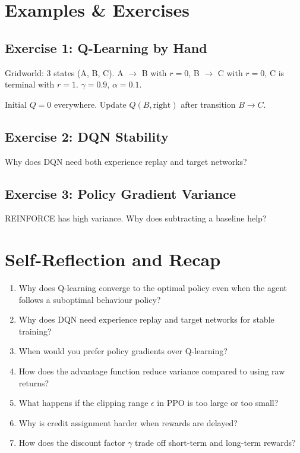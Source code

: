 
\newpage
\section{Examples \& Exercises}

\subsection{Exercise 1: Q-Learning by Hand}

Gridworld: 3 states (A, B, C). A $\to$ B with $r{=}0$, B $\to$ C with $r{=}0$, C is terminal with $r{=}1$. $\gamma = 0.9$, $\alpha = 0.1$.

Initial $Q = 0$ everywhere. Update $Q(B, \text{right})$ after transition $B \to C$.

\subsection{Exercise 2: DQN Stability}

Why does DQN need both experience replay and target networks?

\subsection{Exercise 3: Policy Gradient Variance}

REINFORCE has high variance. Why does subtracting a baseline help?


\section{Self-Reflection and Recap}


\begin{enumerate}
    \item Why does Q-learning converge to the optimal policy even when the agent follows a suboptimal behaviour policy?
    \item Why does DQN need experience replay and target networks for stable training?
    \item When would you prefer policy gradients over Q-learning?
    \item How does the advantage function reduce variance compared to using raw returns?
    \item What happens if the clipping range $\epsilon$ in PPO is too large or too small?
    \item Why is credit assignment harder when rewards are delayed?
    \item How does the discount factor $\gamma$ trade off short-term and long-term rewards?
\end{enumerate}

